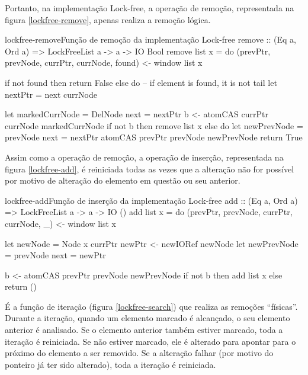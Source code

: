 \documentclass[a4paper,12pt,oldfontcommands]{abntex2}
\begin{document}
Portanto, na implementação Lock-free, a operação de remoção, representada na figura \ref{lockfree-remove}, apenas realiza a remoção lógica.

\begin{code}{lockfree-remove}{Função de remoção da implementação Lock-free}
remove :: (Eq a, Ord a) => LockFreeList a -> a -> IO Bool
remove list x = do
    (prevPtr, prevNode, currPtr, currNode, found) <- window list x

    if not found then return False
    else do
        -- if element is found, it is not tail
        let nextPtr = next currNode

        let markedCurrNode = DelNode { next = nextPtr }
        b <- atomCAS currPtr currNode markedCurrNode
        if not b then remove list x
        else do
            let newPrevNode = prevNode { next = nextPtr }
            atomCAS prevPtr prevNode newPrevNode
            return True
\end{code}

Assim como a operação de remoção, a operação de inserção, representada na figura \ref{lockfree-add}, é reiniciada todas as vezes que a alteração não for possível por motivo de alteração do elemento em questão ou seu anterior.

\begin{code}{lockfree-add}{Função de inserção da implementação Lock-free}
add :: (Eq a, Ord a) => LockFreeList a -> a -> IO ()
add list x = do
    (prevPtr, prevNode, currPtr, currNode, _) <- window list x

    let newNode = Node x currPtr
    newPtr <- newIORef newNode
    let newPrevNode = prevNode { next = newPtr }

    b <- atomCAS prevPtr prevNode newPrevNode
    if not b then add list x
    else return ()
\end{code}

É a função de iteração (figura \ref{lockfree-search}) que realiza as remoções ``físicas''. Durante a iteração, quando um elemento marcado é alcançado, o seu elemento anterior é analisado. Se o elemento anterior também estiver marcado, toda a iteração é reiniciada. Se não estiver marcado, ele é alterado para apontar para o próximo do elemento a ser removido. Se a alteração falhar (por motivo do ponteiro já ter sido alterado), toda a iteração é reiniciada.
\end{document}
